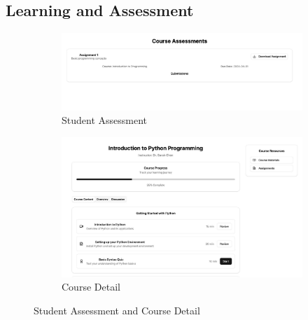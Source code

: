 \documentclass[a4paper, 11pt]{scrreprt}
\begin{document}
\subsection{Learning and Assessment}
\begin{figure}[H]
    \centering
    \begin{subfigure}[b]{0.38\textwidth}
        \centering
        \includegraphics[width=\textwidth]{UI/StudentAssessment.jpg}
        \caption{Student Assessment}
    \end{subfigure}
    \hfill
    \begin{subfigure}[b]{0.38\textwidth}
        \centering
        \includegraphics[width=\textwidth]{UI/CourseDetail.jpg}
        \caption{Course Detail}
    \end{subfigure}
    \caption{Student Assessment and Course Detail}
\end{figure}
\end{document}
